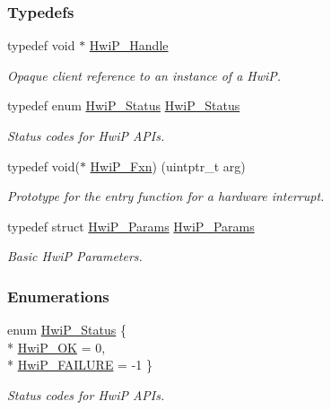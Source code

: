 \subsubsection*{Typedefs}
\begin{DoxyCompactItemize}
\item 
typedef void $\ast$ \hyperlink{_hwi_p_8h_a7dd325ff62af296374efc6d317f5e368}{Hwi\+P\+\_\+\+Handle}
\begin{DoxyCompactList}\small\item\em Opaque client reference to an instance of a Hwi\+P. \end{DoxyCompactList}\item 
typedef enum \hyperlink{_hwi_p_8h_a8f508a9a62c31a942ffc9438f53dd258}{Hwi\+P\+\_\+\+Status} \hyperlink{_hwi_p_8h_a1d0a42f3a5bb047cf6a14413f2a58e9f}{Hwi\+P\+\_\+\+Status}
\begin{DoxyCompactList}\small\item\em Status codes for Hwi\+P A\+P\+Is. \end{DoxyCompactList}\item 
typedef void($\ast$ \hyperlink{_hwi_p_8h_a53a36fe33e22847927ceddbb63fb50c7}{Hwi\+P\+\_\+\+Fxn}) (uintptr\+\_\+t arg)
\begin{DoxyCompactList}\small\item\em Prototype for the entry function for a hardware interrupt. \end{DoxyCompactList}\item 
typedef struct \hyperlink{struct_hwi_p___params}{Hwi\+P\+\_\+\+Params} \hyperlink{_hwi_p_8h_a7eefe35fc4269b78348f74e5db9c4dca}{Hwi\+P\+\_\+\+Params}
\begin{DoxyCompactList}\small\item\em Basic Hwi\+P Parameters. \end{DoxyCompactList}\end{DoxyCompactItemize}
\subsubsection*{Enumerations}
\begin{DoxyCompactItemize}
\item 
enum \hyperlink{_hwi_p_8h_a8f508a9a62c31a942ffc9438f53dd258}{Hwi\+P\+\_\+\+Status} \{ \\*
\hyperlink{_hwi_p_8h_a8f508a9a62c31a942ffc9438f53dd258a96e82ebb87c2c36bba1fdd072fcec2f9}{Hwi\+P\+\_\+\+O\+K} = 0, 
\\*
\hyperlink{_hwi_p_8h_a8f508a9a62c31a942ffc9438f53dd258aa0988bb08bdcf17a219385320e200000}{Hwi\+P\+\_\+\+F\+A\+I\+L\+U\+R\+E} = -\/1
 \}
\begin{DoxyCompactList}\small\item\em Status codes for Hwi\+P A\+P\+Is. \end{DoxyCompactList}\end{DoxyCompactItemize}
